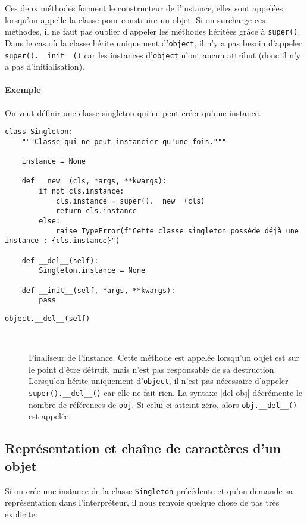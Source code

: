 Ces deux méthodes forment le constructeur\label{constructeur} de l'instance, elles sont appelées lorsqu'on appelle la classe pour construire un objet. Si on surcharge ces méthodes, il ne faut pas oublier d'appeler les méthodes héritées grâce à \texttt{super()}. Dans le cas où la classe hérite uniquement d'\texttt{object}, il n'y a pas besoin d'appeler \texttt{super().__init__()} car les instances d'\texttt{object} n'ont aucun attribut (donc il n'y a pas d'initialisation).

\paragraph{Exemple} On veut définir une classe \og singleton \fg{} qui ne peut créer qu'une instance.

\begin{verbatim}
class Singleton:
    """Classe qui ne peut instancier qu'une fois."""

    instance = None

    def __new__(cls, *args, **kwargs):
        if not cls.instance:
            cls.instance = super().__new__(cls)
            return cls.instance
        else:
            raise TypeError(f"Cette classe singleton possède déjà une instance : {cls.instance}")

    def __del__(self):
        Singleton.instance = None

    def __init__(self, *args, **kwargs):
        pass
\end{verbatim}

\begin{description}
    \item[\texttt{object.__del__(self)}]~

    Finaliseur de l'instance. Cette méthode est appelée lorsqu'un objet est sur le point d'être détruit, mais n'est pas responsable de sa destruction. Lorsqu'on hérite uniquement d'\texttt{object}, il n'est pas nécessaire d'appeler \texttt{super().__del__()} car elle ne fait rien. La syntaxe |del obj| décrémente le nombre de références de \texttt{obj}. Si celui-ci atteint zéro, alors \texttt{obj.__del__()} est appelée.
\end{description}

\subsection{Représentation et chaîne de caractères d'un objet}
Si on crée une instance de la classe \texttt{Singleton} précédente et qu'on demande sa représentation dans l'interpréteur, il nous renvoie quelque chose de pas très explicite:

